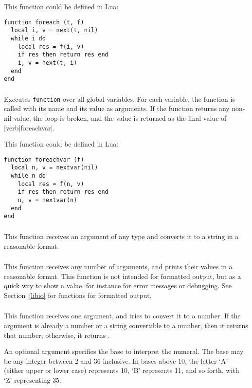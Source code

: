 This function could be defined in Lua:
\begin{verbatim}
function foreach (t, f)
  local i, v = next(t, nil)
  while i do
    local res = f(i, v)
    if res then return res end
    i, v = next(t, i)
  end
end
\end{verbatim}

\subsubsection*{\ff {}}
Executes \verb|function| over all global variables.
For each variable,
the function is called with its name and its value as arguments.
If the function returns any non-nil value,
the loop is broken, and the value is returned
as the final value of |verb|foreachvar|.

This function could be defined in Lua:
\begin{verbatim}
function foreachvar (f)
  local n, v = nextvar(nil)
  while n do
    local res = f(n, v)
    if res then return res end
    n, v = nextvar(n)
  end
end
\end{verbatim}

\subsubsection*{\ff {}}
This function receives an argument of any type and
converts it to a string in a reasonable format.

\subsubsection*{\ff {}}
This function receives any number of arguments,
and prints their values in a reasonable format.
This function is not intended for formatted output,
but as a quick way to show a value,
for instance for error messages or debugging.
See Section~\ref{libio} for functions for formatted output.

\subsubsection*{\ff {}}
This function receives one argument,
and tries to convert it to a number.
If the argument is already a number or a string convertible
to a number, then it returns that number;
otherwise, it returns \nil.

An optional argument specifies the base to interpret the numeral.
The base may be any integer between 2 and 36 inclusive.
In bases above  10, the letter `A' (either upper or lower case)
represents 10, `B' represents 11, and so forth, with `Z' representing 35.

